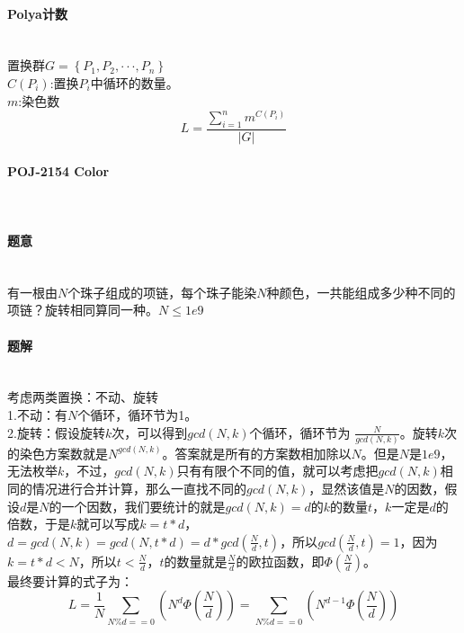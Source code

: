 %
\paragraph{Polya计数}~{}
\\
置换群$G= \left \{ P_{1},P_{2},\cdot \cdot \cdot ,P_{n} \right \}$\\
$C(P_{i})$:置换$P_{i}$中循环的数量。\\
$m$:染色数\\
\[ L=\frac{\sum_{i=1}^{n}m^{C(P_{i})}}{\left | G \right |} \]
\paragraph{POJ-2154 Color}~{}
\paragraph{题意}~{}
\\
有一根由$N$个珠子组成的项链，每个珠子能染$N$种颜色，一共能组成多少种不同的项链？旋转相同算同一种。$N\leq1e9$
\paragraph{题解}~{}
\\
考虑两类置换：不动、旋转\\
1.不动：有$N$个循环，循环节为1。\\
2.旋转：假设旋转$k$次，可以得到$gcd(N, k)$个循环，循环节为 $\frac{N}{gcd(N,k)}$。旋转$k$次的染色方案数就是$N^{gcd(N,k)}$。答案就是所有的方案数相加除以$N$。但是$N$是$1e9$，无法枚举$k$，不过，$gcd(N, k)$只有有限个不同的值，就可以考虑把$gcd(N, k)$相同的情况进行合并计算，那么一直找不同的$gcd(N, k)$，显然该值是$N$的因数，假设$d$是$N$的一个因数，我们要统计的就是$ gcd(N, k) = d$的$k$的数量$t$，$k$一定是$d$的倍数，于是$k$就可以写成$k = t * d$，$d = gcd(N, k) = gcd(N, t * d) = d * gcd(\frac{N}{d}, t)$，所以$gcd(\frac{N}{d}, t) = 1$，因为$k = t * d < N$，所以$t < \frac{N}{d}$，$t$的数量就是$\frac{N}{d}$的欧拉函数，即$\Phi{(\frac{N}{d})}$。\\
最终要计算的式子为：\\
\[ L = \frac{1}{N}\sum_{N\%d==0}(N^d\Phi{(\frac{N}{d})}) = \sum_{N\%d==0}(N^{d-1}\Phi{(\frac{N}{d})}) \]
%
